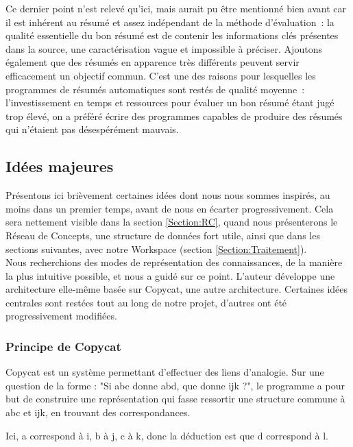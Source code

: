 \documentclass[a4paper, 12pt]{article}
\begin{document}
  Ce dernier point n'est relevé qu'ici, mais aurait pu être mentionné bien avant car il est inhérent au résumé et assez indépendant de la méthode d'évaluation~: la qualité essentielle du bon résumé est de contenir les informations clés présentes dans la source, une caractérisation vague et impossible à préciser. Ajoutons également que des résumés en apparence très différents peuvent servir efficacement un objectif commun. C'est une des raisons pour lesquelles les programmes de résumés automatiques sont restés de qualité moyenne~: l'investissement en temps et ressources pour évaluer un bon résumé étant jugé trop élevé, on a préféré écrire des programmes capables de produire des résumés qui n'étaient pas désespérément mauvais.

 
\subsection{Idées majeures}

Présentons ici brièvement certaines idées dont nous nous sommes inspirés, au moins dans un premier temps, avant de nous en écarter progressivement. Cela sera nettement visible dans la section \ref{Section:RC}, quand nous présenterons le Réseau de Concepts, une structure de données fort utile, ainsi que dans les sections suivantes, avec notre Workspace (section \ref{Section:Traitement}).\\

Nous recherchions des modes de représentation des connaissances, de la manière la plus intuitive possible, et \cite{parmentier_specification_1998} nous a guidé sur ce point. L'auteur développe une architecture elle-même basée sur Copycat, une autre architecture. Certaines idées centrales sont restées tout au long de notre projet, d'autres ont été progressivement modifiées.

\subsubsection{Principe de Copycat}

Copycat est un système permettant d'effectuer des liens d'analogie. Sur une question de la forme : "Si abc donne abd, que donne ijk ?", le programme a pour but de construire une représentation qui fasse ressortir une structure commune à abc et ijk, en trouvant des correspondances.

Ici, a correspond à i, b à j, c à k, donc la déduction est que d correspond à l.
\end{document}
